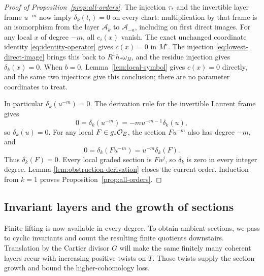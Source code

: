 \begin{proof}[Proof of Proposition~\ref{prop:all-orders}]
The injection \(\tau_*\) and the invertible layer frame \(u^{-m}\)
now imply \(\delta_k(t_i)=0\) on every chart: multiplication by that
frame is an isomorphism from the layer \(\mathcal A_k\) to
\(\mathcal A_{-a}\), including on first direct images.  For any local
\(x\) of degree \(-m\), all \(e_i(x)\) vanish.  The exact unchanged
coordinate identity \eqref{eq:identity-operator} gives \(c(x)=0\) in
\(M^\flat\).  The injection \eqref{eq:lowest-direct-image} brings this
back to \(R^1h_*\omega_H\), and the residue injection gives
\(\delta_k(x)=0\).  When \(b=0\), Lemma~\ref{lem:local-symbol} gives
\(c(x)=0\) directly, and the same two injections give this conclusion;
there are no parameter coordinates to treat.

In particular \(\delta_k(u^{-m})=0\).  The derivation rule for the
invertible Laurent frame gives
\[
 0=\delta_k(u^{-m})=-m u^{-m-1}\delta_k(u),
\]
so \(\delta_k(u)=0\).  For any local \(F\in g_*\mathcal O_E\), the section
\(Fu^{-m}\) also has degree \(-m\), and
\[
 0=\delta_k(Fu^{-m})=u^{-m}\delta_k(F).
\]
Thus \(\delta_k(F)=0\).  Every local graded section is \(Fu^j\), so
\(\delta_k\) is zero in every integer degree.  Lemma
\ref{lem:obstruction-derivation} closes the current order.  Induction
from \(k=1\) proves Proposition~\ref{prop:all-orders}.
\end{proof}

\subsection{Invariant layers and the growth of sections}

Finite lifting is now available in every degree.  To obtain ambient
sections, we pass to cyclic invariants and count the resulting finite
quotients downstairs.  Translation by the Cartier divisor \(G\) will
make the same finitely many coherent layers recur with increasing
positive twists on \(T\).  Those twists supply the section growth and
bound the higher-cohomology loss.

